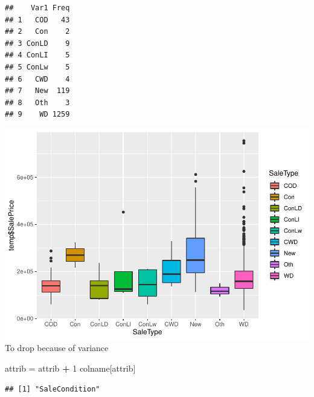 \documentclass[]{article}
\newenvironment{Shaded}{\begin{snugshade}}{\end{snugshade}}
\newcommand{\DecValTok}[1]{\textcolor[rgb]{0.00,0.00,0.81}{#1}}
\newcommand{\StringTok}[1]{\textcolor[rgb]{0.31,0.60,0.02}{#1}}
\newcommand{\OperatorTok}[1]{\textcolor[rgb]{0.81,0.36,0.00}{\textbf{#1}}}
\newcommand{\NormalTok}[1]{#1}
\begin{document}
\begin{verbatim}
##    Var1 Freq
## 1   COD   43
## 2   Con    2
## 3 ConLD    9
## 4 ConLI    5
## 5 ConLw    5
## 6   CWD    4
## 7   New  119
## 8   Oth    3
## 9    WD 1259
\end{verbatim}

\includegraphics{EDA_files/figure-latex/unnamed-chunk-101-1.pdf} To drop
because of variance

\begin{Shaded}
\begin{Highlighting}[]
\NormalTok{attrib =}\StringTok{ }\NormalTok{attrib }\OperatorTok{+}\StringTok{ }\DecValTok{1}
\NormalTok{colname[attrib]}
\end{Highlighting}
\end{Shaded}

\begin{verbatim}
## [1] "SaleCondition"
\end{verbatim}
\end{document}
